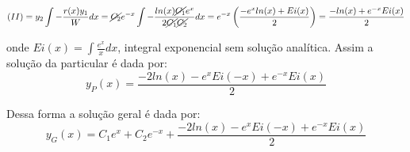 \begin{equation*}
    (II) = y_2\int -\frac{r(x)y_1}{W} dx = \cancel{C_2}e^{-x}\int -\frac{ln(x)\cancel{C_1}e^{x}}{2\cancel{C_1}\cancel{C_2}} dx = e^{-x}\left(\frac{-e^{x}ln(x) + Ei(x)}{2}\right) = \frac{-ln(x) + e^{-x}Ei(x)}{2}
\end{equation*}

onde $Ei(x) = \int \frac{e^x}{x} dx$, integral exponencial sem solução analítica. Assim a solução da particular é dada por:
\begin{equation*}
    y_P (x) = \frac{-2ln(x) - e^xEi(-x) + e^{-x}Ei(x)}{2}
\end{equation*}

Dessa forma a solução geral é dada por:
\begin{equation*}
    y_G (x) = C_1e^x + C_2e^{-x} + \frac{-2ln(x) - e^xEi(-x) + e^{-x}Ei(x)}{2}
\end{equation*}